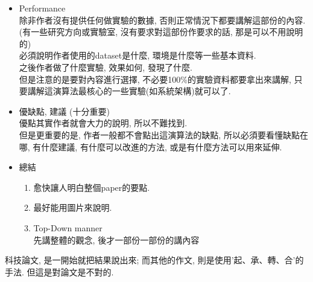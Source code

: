\begin{enumerate}
{\begin{itemize}
{\begin{enumerate}
          \item
          {
            Proof\\
            在報告時是絕對不用講的
          } %
        \end{enumerate}
      } %

      \item
      {
        Performance\\
        除非作者沒有提供任何做實驗的數據, 否則正常情況下都要講解這部份的內容.\\
        (有一些研究方向或實驗室, 沒有要求對這部份作要求的話, 那是可以不用說明的)\\
         
        必須說明作者使用的dataset是什麼, 環境是什麼等一些基本資料.\\
         
        之後作者做了什麼實驗, 效果如何, 發現了什麼.\\
         
        但是注意的是要對內容進行選擇, 不必要100\%的實驗資料都要拿出來講解, 只要講解這演算法最核心的一些實驗(如系統架構)就可以了.
      } %

      \item
      {
        優缺點, 建議 (十分重要)\\
        優點其實作者就會大力的說明, 所以不難找到.\\
         
        但是更重要的是, 作者一般都不會點出這演算法的缺點, 所以必須要看懂缺點在哪, 有什麼建議, 有什麼可以改進的方法, 或是有什麼方法可以用來延伸.
      } %

      \item
      {
        總結
        \begin{enumerate}
          \item
          {
            愈快讓人明白整個paper的要點.
          } %

          \item
          {
            最好能用圖片來說明.
          } %

          \item
          {
            Top-Down manner\\
            先講整體的觀念, 後才一部份一部份的講內容
          } %
        \end{enumerate}
      } %
    \end{itemize}

    科技論文, 是一開始就把結果說出來; 而其他的作文, 則是使用'起、承、轉、合'的手法. 但這是對論文是不對的.
  } %
\end{enumerate}

